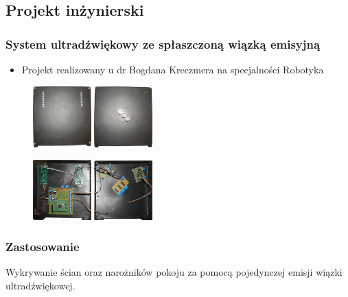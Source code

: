 \subsection{Projekt inżynierski}
\begin{frame}
  \frametitle{System ultradźwiękowy ze spłaszczoną wiązką emisyjną}
  
  \begin{itemize}
  	\item Projekt realizowany u dr Bogdana Kreczmera na specjalności Robotyka
  \end{itemize}
  \begin{figure}
    \includegraphics[width=0.2\textwidth]{img/zewnatrz_tyl}
    \hspace{1in}
    \includegraphics[width=0.2\textwidth]{img/zewnatrz_przod} 
    \bigskip
    
    \includegraphics[width=0.2\textwidth]{img/srodek_tyl} 
    \hspace{1in}
    \includegraphics[width=0.2\textwidth]{img/tyl} 
  \end{figure}
\end{frame}

\begin{frame}
  \frametitle{Zastosowanie}
  
  Wykrywanie ścian oraz narożników pokoju
  za pomocą pojedynczej emisji wiązki ultradźwiękowej.
\end{frame}

